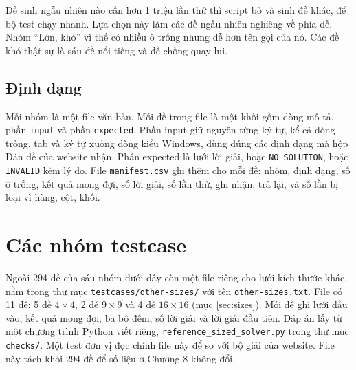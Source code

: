Đề sinh ngẫu nhiên nào cần hơn 1 triệu lần thử thì script bỏ và sinh đề khác, để bộ test chạy nhanh. Lựa chọn này làm các đề ngẫu nhiên nghiêng về phía dễ. Nhóm ``Lớn, khó'' vì thế có nhiều ô trống nhưng dễ hơn tên gọi của nó. Các đề khó thật sự là sáu đề nổi tiếng và đề chống quay lui.

\subsection*{Định dạng}

Mỗi nhóm là một file văn bản. Mỗi đề trong file là một khối gồm dòng mô tả, phần \texttt{input} và phần \texttt{expected}. Phần input giữ nguyên từng ký tự, kể cả dòng trống, tab và ký tự xuống dòng kiểu Windows, dùng đúng các định dạng mà hộp Dán đề của website nhận. Phần expected là lưới lời giải, hoặc \texttt{NO SOLUTION}, hoặc \texttt{INVALID} kèm lý do. File \texttt{manifest.csv} ghi thêm cho mỗi đề: nhóm, định dạng, số ô trống, kết quả mong đợi, số lời giải, số lần thử, ghi nhận, trả lại, và số lần bị loại vì hàng, cột, khối.

\section{Các nhóm testcase}

Ngoài 294 đề của sáu nhóm dưới đây còn một file riêng cho lưới kích thước khác, nằm trong thư mục \texttt{testcases/other-sizes/} với tên \texttt{other-sizes.txt}. File có 11 đề: 5 đề \(4 \times 4\), 2 đề \(9 \times 9\) và 4 đề \(16 \times 16\) (mục \ref{sec:sizes}). Mỗi đề ghi lưới đầu vào, kết quả mong đợi, ba bộ đếm, số lời giải và lời giải đầu tiên. Đáp án lấy từ một chương trình Python viết riêng, \texttt{reference\_sized\_solver.py} trong thư mục \texttt{checks/}. Một test đơn vị đọc chính file này để so với bộ giải của website. File này tách khỏi 294 đề để số liệu ở Chương 8 không đổi.


